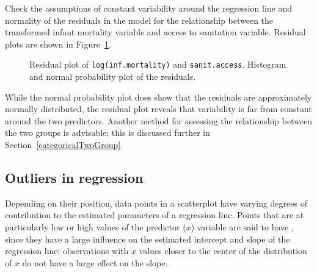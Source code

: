 \begin{example}{Check the assumptions of constant variability around the regression line and normality of the residuals in the model for the relationship between the transformed infant mortality variable and access to sanitation variable. Residual plots are shown in Figure~\ref{wdiResid}.
		
\begin{figure}[h]
	\centering
	\caption{ Residual plot of \texttt{log(inf.mortality)} and \texttt{sanit.access}.  Histogram and normal probability plot of the residuals.}
	\label{wdiResid}
\end{figure}		
}		

While the normal probability plot does show that the residuals are approximately normally distributed, the residual plot reveals that variability is far from constant around the two predictors. Another method for assessing the relationship between the two groups is advisable; this is discussed further in Section~\ref{categoricalTwoGroup}.

\label{wdiAssumptionsEx}	

\end{example}


\subsection{Outliers in regression}

Depending on their position, data points in a scatterplot have varying degrees of contribution to the estimated parameters of a regression line. Points that are at particularly low or high values of the predictor ($x$) variable are said to have , since they have a large influence on the estimated intercept and slope of the regression line; observations with $x$ values closer to the center of the distribution of $x$ do not have a large effect on the slope. 

